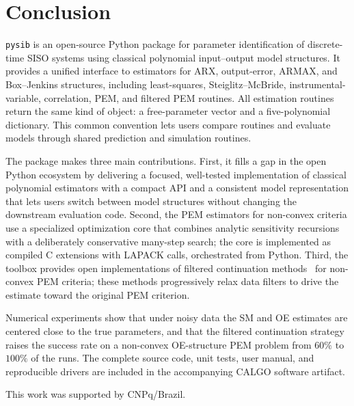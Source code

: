 \documentclass[acmsmall,screen,review]{acmart}
\begin{document}
\section{Conclusion}
\label{sec:conclusion}

\texttt{pysib} is an open-source Python package for parameter
identification of discrete-time SISO systems using classical
polynomial input--output model structures.
It provides a unified interface to estimators for ARX, output-error, ARMAX,
and Box--Jenkins structures, including least-squares, Steiglitz--McBride,
instrumental-variable, correlation, PEM, and filtered PEM routines.  All
estimation routines return the same kind of object: a free-parameter vector
and a five-polynomial dictionary.  This common convention lets users compare
routines and evaluate models through shared prediction and simulation
routines.

The package makes three main contributions.
First, it fills a gap in the open Python ecosystem by delivering a focused,
well-tested implementation of classical polynomial estimators with a compact
API and a consistent model representation that lets users switch between
model structures without changing the downstream evaluation code.
Second, the PEM estimators for non-convex criteria use a specialized
optimization core that combines analytic sensitivity recursions with a
deliberately conservative many-step search; the core is implemented as
compiled C extensions with LAPACK calls, orchestrated from Python.
Third, the toolbox provides open implementations of filtered
continuation methods~\cite{eckhard2013input,eckhard2017cost} for non-convex
PEM criteria; these methods progressively relax data filters
to drive the estimate toward the original PEM criterion.

Numerical experiments show that under noisy data the SM and OE
estimates are centered close to the true parameters, and that the
filtered continuation strategy raises the success rate on a
non-convex OE-structure PEM problem from $60\%$ to $100\%$ of the runs.
The complete source code, unit tests, user manual, and reproducible drivers
are included in the accompanying CALGO software artifact.

\begin{acks}
This work was supported by CNPq/Brazil.
\end{acks}



\end{document}
